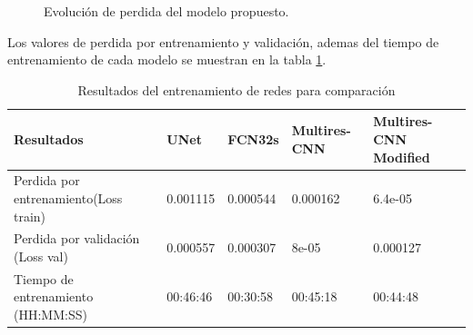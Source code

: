 \documentclass[10pt,letterpaper]{article}
\begin{document}
%

\begin{figure}[H]
      \begin{center}
        \caption{Evolución de perdida del modelo propuesto.}
        \label{tif125}
      \end{center}
\end{figure}


Los valores de perdida por entrenamiento y validación, ademas del tiempo de entrenamiento de cada modelo se muestran en la tabla \ref{resultadoscomparacion}.

\begin{table}[H]
\begin{center}
\begin{tabular}{ p{1.8cm}  p{1.5cm}  p{1.5cm}  p{2.2cm}  p{2.4cm} }
\hline
Resultados & UNet & FCN32s & Multires-CNN & Multires-CNN Modified\\	
\hline
Perdida por entrenamiento(Loss train) & 0.001115  & 0.000544 & 0.000162 & 6.4e-05 \\
\hline
Perdida por validación (Loss val) & 0.000557 & 0.000307 & 8e-05 & 0.000127 \\
\hline
Tiempo de entrenamiento (HH:MM:SS) & 00:46:46 & 00:30:58 & 00:45:18 & 00:44:48 \\
\hline
\end{tabular}
\caption{Resultados del entrenamiento de redes para comparación}
\label{resultadoscomparacion}
\end{center}
\end{table}
\end{document}

